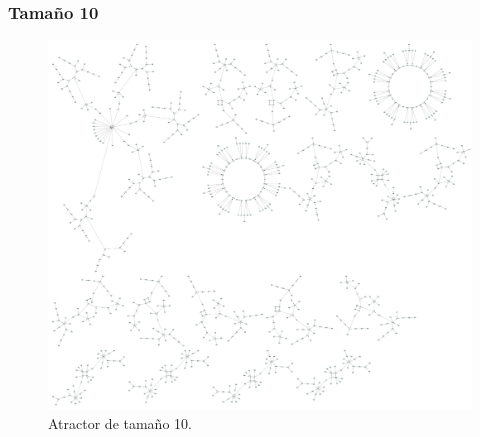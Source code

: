 \documentclass[11pt]{article}
\begin{document}
			\subsubsection{Tamaño 10}
			\begin{figure}[H]
			\centering
			\includegraphics[scale=0.1]{resources/Atractores54/atractor_54_size_10.png}
			\caption{Atractor de tamaño 10.}\label{fig:picture}
			\end{figure}
\end{document}

